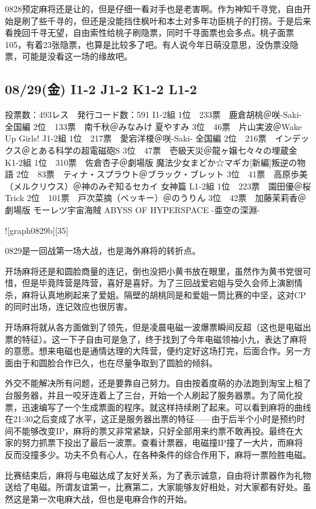 0828预定麻将还是让的，但是仔细一看对手也是老害啊。作为神知千寻党，自由开始是刷了些千寻的，但还是没能挡住枫叶和本土对多年功臣桃子的打捞。于是后来看挽回千寻无望，自由索性给桃子刷隐票，同时千寻面票也会多点。桃子面票105，有着23张隐票，也算是比较多了吧。有人说今年日萌没意思，没伪票没隐票，可能是没看这一场的缘故吧。

\subsection{08/29(金) I1-2 J1-2 K1-2 L1-2}

	投票数：493レス　発行コード数：591
	I1-2組
	1位　233票　鹿倉胡桃＠咲-Saki- 全国編
	2位　133票　南千秋＠みなみけ 夏やすみ
	3位　46票　片山実波＠Wake Up Girls!
	J1-2組
	1位　217票　愛宕洋榎＠咲-Saki- 全国編
	2位　216票　インデックス＠とある科学の超電磁砲S
	3位　47票　壱級天災＠龍ヶ嬢七々々の埋蔵金
	K1-2組
	1位　310票　佐倉杏子＠劇場版 魔法少女まどか☆マギカ[新編]叛逆の物語
	2位　83票　ティナ・スプラウト＠ブラック・ブレット
	3位　41票　高原歩美（メルクリウス）＠神のみぞ知るセカイ 女神篇
	L1-2組
	1位　223票　園田優＠桜Trick
	2位　101票　戸次菜摘（ベッキー）＠のうりん
	3位　42票　加藤茉莉香＠劇場版 モーレツ宇宙海賊 ABYSS OF HYPERSPACE -亜空の深淵-

![graph0829b][35]

0829是一回战第一场大战，也是海外麻将的转折点。

开场麻将还是和圆脸商量的连记，倒也没把小黄书放在眼里，虽然作为黄书党很可惜，但是毕竟阵营是阵营，喜好是喜好。为了三回战爱宕姐与受久会师上演剧情杀，麻将认真地刷起来了爱姐。隔壁的胡桃同是和爱姐一筒比赛的中坚，这对CP的同时出场，连记效应也很厉害。

开场麻将就从各方面做到了领先，但是凌晨电磁一波爆票瞬间反超（这也是电磁出票的特征）。这一下子自由可是急了，终于找到了今年电磁领袖小九，表达了麻将的意愿。想来电磁也是通情达理的大阵营，便约定好这场打完，后面合作。另一方面由于和圆脸合作已久，也在尽量争取到了圆脸的倾斜。

外交不能解决所有问题，还是要靠自己努力。自由按着度萌的办法跑到淘宝上租了台服务器，并且一咬牙连着上了三台，开始一个人刷起了服务器票。为了简化投票，迅速编写了一个生成票面的程序。就这样持续刷了起来。可以看到麻将的曲线在21:30之后变成了水平，这正是服务器出票的特征——由于后半个小时是预约时间不能够改变IP，麻将的票又非常紧缺，只好全部用来约票不敢再投。最终在大家的努力抓票下投出了最后一波票。查看计票器，电磁撞IP撞了一大片，而麻将反而没撞多少。功夫不负有心人，在各种条件的综合作用下，麻将一票险胜电磁。

比赛结束后，麻将与电磁达成了友好关系，为了表示诚意，自由将计票器作为礼物送给了电磁。所谓友谊第一，比赛第二，大家能够友好相处，对大家都有好处。虽然这是第一次电麻大战，但也是电麻合作的开始。

